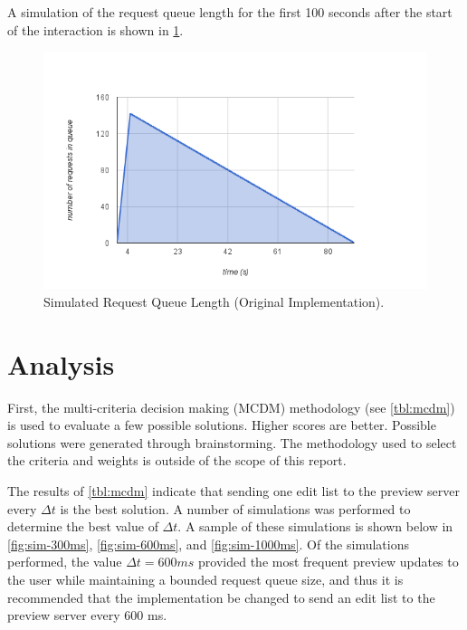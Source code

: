 \documentclass[se,resubmit]{uw-wkrpt}
\begin{document}
A simulation of the request queue length for the first 100 seconds after the
start of the interaction is shown in \ref{fig:sim-orig}.

\begin{figure}
  \centering
  \includegraphics{sim-orig}
  \caption{Simulated Request Queue Length (Original Implementation).}
  \label{fig:sim-orig}
\end{figure}

\section{Analysis}

First, the multi-criteria decision making (MCDM) methodology (see
\ref{tbl:mcdm}) is used to evaluate a few possible solutions. Higher scores are
better. Possible solutions were generated through brainstorming.  The
methodology used to select the criteria and weights is outside of the scope of
this report.

The results of \ref{tbl:mcdm} indicate that sending one edit list to the
preview server every $\Delta t$ is the best solution. A number of simulations was
performed to determine the best value of $\Delta t$. A sample of these
simulations is shown below in \ref{fig:sim-300ms}, \ref{fig:sim-600ms}, and \ref{fig:sim-1000ms}. Of the simulations performed, the value
$\Delta t=600 ms$ provided the most frequent preview updates to the user while
maintaining a bounded request queue size, and thus it is recommended that the
implementation be changed to send an edit list to the preview server every 600
ms.
\end{document}
